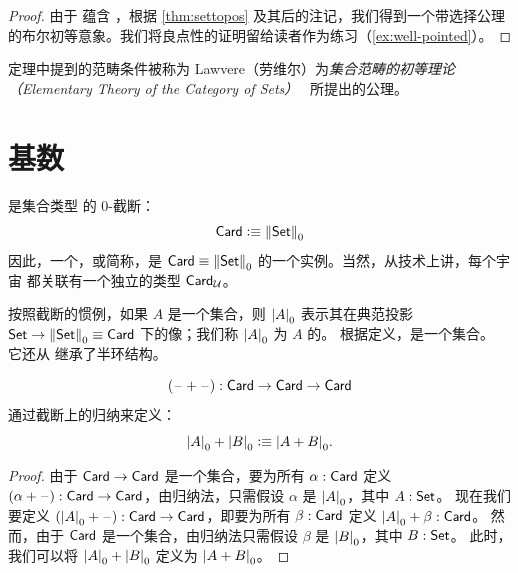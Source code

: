\begin{proof}
  由于 \choice{} 蕴含 \LEM{}，根据 \cref{thm:settopos} 及其后的注记，我们得到一个带选择公理的布尔初等意象。我们将良点性的证明留给读者作为练习（\cref{ex:well-pointed}）。
\end{proof}

\begin{rmk}
  定理中提到的范畴条件被称为 Lawvere（劳维尔）为\emph{集合范畴的初等理论（Elementary Theory of the Category of Sets）}~\cite{lawvere:etcs-long} 所提出的公理。
\end{rmk}

\section{基数}
\label{sec:cardinals}

\begin{defn}\label{defn:card}
  是集合类型 \set 的 0-截断：
  \[ \card \defeq \pizero{\set} \]
  因此，一个，或简称，是 $\card\jdeq \pizero\set$ 的一个实例。当然，从技术上讲，每个宇宙 \type 都关联有一个独立的类型 $\card_{\UU}$。
\end{defn}



按照截断的惯例，如果 $A$ 是一个集合，则 $\cd{A}$ 表示其在典范投影 $\set \to \trunc0\set \jdeq \card$ 下的像；我们称 $\cd{A}$ 为 $A$ 的。
根据定义，\card 是一个集合。
它还从 \set 继承了半环结构。

\begin{defn}
  \[ (\blank+\blank) : \card \to \card \to \card \]
  通过截断上的归纳来定义：
  \[ \cd{A} + \cd{B} \defeq \cd{A+B}.\]
\end{defn}

\begin{proof}
  由于 $\card\to\card$ 是一个集合，要为所有 $\alpha:\card$ 定义 $(\alpha+\blank):\card\to\card$，由归纳法，只需假设 $\alpha$ 是 $\cd{A}$，其中 $A:\set$。
  现在我们要定义 $(\cd{A}+\blank) :\card\to\card$，即要为所有 $\beta:\card$ 定义 $\cd{A}+\beta :\card$。
  然而，由于 $\card$ 是一个集合，由归纳法只需假设 $\beta$ 是 $\cd{B}$，其中 $B:\set$。
  此时，我们可以将 $\cd{A}+\cd{B}$ 定义为 $\cd{A+B}$。
\end{proof}

